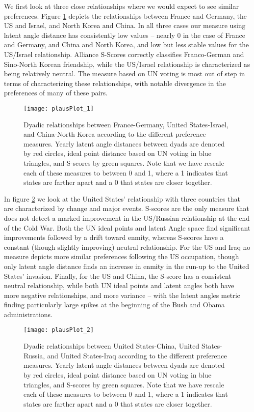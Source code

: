 We first look at three close relationships where we would expect to see similar preferences. Figure \ref{friendly:dyads} depicts the relationships between France and Germany, the US and Israel, and North Korea and China. In all three cases our measure using latent angle distance has consistently low values -- nearly $0$ in the case of France and Germany, and China and North Korea, and low but less stable values for the US/Israel relationship. Alliance S-Scores correctly classifies Franco-German and Sino-North Korean friendship, while the US/Israel relationship is characterized as being relatively neutral. The measure based on UN voting is most out of step in terms of characterizing these relationships, with notable divergence in the preferences of many of these pairs.

\begin{figure}
	\centering
	\texttt{[image: plausPlot\_1]}
	\caption{Dyadic relationships between France-Germany, United States-Israel, and China-North Korea according to the different preference measures. Yearly latent angle distances between dyads are denoted by red circles, ideal point distance based on UN voting in blue triangles, and S-scores by green squares. Note that we have rescale each of these measures to between 0 and 1, where a 1 indicates that states are farther apart and a 0 that states are closer together.}
	\label{friendly:dyads}
\end{figure}

In figure \ref{unfriendly:dyads} we look at the United States' relationship with three countries that are characterized by change and major events. S-scores are the only measure that does not detect a marked improvement in the US/Russian relationship at the end of the Cold War. Both the UN ideal points and latent Angle space find significant improvements followed by a drift toward enmity, whereas S-scores have a constant (though slightly improving) neutral relationship. For the US and Iraq no measure depicts more similar preferences following the US occupation, though only latent angle distance finds an increase in enmity in the run-up to the United States' invasion. Finally, for the US and China, the S-score has a consistent neutral relationship, while both UN ideal points and latent angles both have more negative relationships, and more variance -- with the latent angles metric finding particularly large spikes at the beginning of the Bush and Obama administrations.

\begin{figure}
	\centering
	\texttt{[image: plausPlot\_2]}
	\caption{Dyadic relationships between United States-China, United States-Russia, and United States-Iraq according to the different preference measures. Yearly latent angle distances between dyads are denoted by red circles, ideal point distance based on UN voting in blue triangles, and S-scores by green squares. Note that we have rescale each of these measures to between 0 and 1, where a 1 indicates that states are farther apart and a 0 that states are closer together.}
	\label{unfriendly:dyads}
\end{figure}

